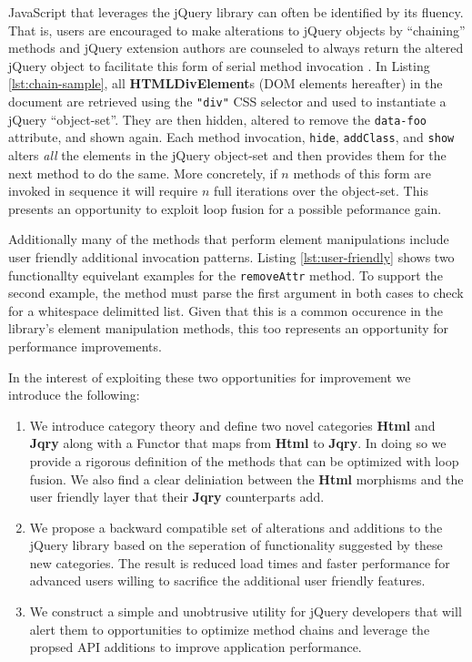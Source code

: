 \documentclass[preprint]{sigplanconf}
\begin{document}
JavaScript that leverages the jQuery library can often be identified by its fluency. That is, users are encouraged to make alterations to jQuery objects by ``chaining'' methods and jQuery extension authors are counseled to always return the altered jQuery object to facilitate this form of serial method invocation \cite{bib:chaining}. In Listing \ref{lst:chain-sample}, all \textbf{HTMLDivElement}s (DOM elements hereafter) in the document are retrieved using the \verb|"div"| CSS selector and used to instantiate a jQuery ``object-set''. They are then hidden, altered to remove the \verb|data-foo| attribute, and shown again. Each method invocation, \verb|hide|, \verb|addClass|, and \verb|show| alters \textit{all} the elements in the jQuery object-set and then provides them for the next method to do the same. More concretely, if \begin{math}n\end{math} methods of this form are invoked in sequence it will require \begin{math}n\end{math} full iterations over the object-set. This presents an opportunity to exploit loop fusion for a possible peformance gain.

Additionally many of the methods that perform element manipulations include user friendly additional invocation patterns. Listing \ref{lst:user-friendly} shows two functionallty equivelant examples for the \verb|removeAttr| method. To support the second example, the method must parse the first argument in both cases to check for a whitespace delimitted list. Given that this is a common occurence in the library's element manipulation methods, this too represents an opportunity for performance improvements.

In the interest of exploiting these two opportunities for improvement we introduce the following:

\begin{enumerate}
\item We introduce category theory and define two novel categories \textbf{Html} and \textbf{Jqry} along with a Functor that maps from \textbf{Html} to \textbf{Jqry}. In doing so we provide a rigorous definition of the methods that can be optimized with loop fusion. We also find a clear deliniation between the \textbf{Html} morphisms and the user friendly layer that their \textbf{Jqry} counterparts add.
\item We propose a backward compatible set of alterations and additions to the jQuery library based on the seperation of functionality suggested by these new categories. The result is reduced load times and faster performance for advanced users willing to sacrifice the additional user friendly features.
\item We construct a simple and unobtrusive utility for jQuery developers that will alert them to opportunities to optimize method chains and leverage the propsed API additions to improve application performance.
\end{enumerate}
\end{document}
